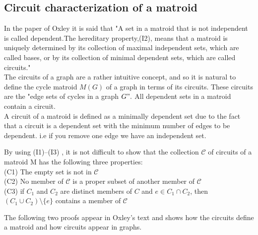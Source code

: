 \documentclass[../main.tex]{subfiles}
\begin{document}
\subsection{Circuit characterization of a matroid}
In the paper of Oxley \cite{ox_paper} it is said that "A set in a matroid that is not independent is called dependent.The hereditary property,(I2), means that a matroid is uniquely determined by its collection of maximal independent sets, which are called bases, or by its collection of minimal dependent sets, which are called circuits." \\
\indent The circuits of a graph are a rather intuitive concept, and so it is natural to define the cycle matroid $M(G)$ of a graph in terms of its circuits. These circuits are the "edge sets of cycles in a graph $G".$ All dependent sets in a matroid contain a circuit.\\
\indent A circuit of a matroid is defined as a minimally dependent set due to the fact that a circuit is a dependent set with the minimum number of edges to be dependent. i.e if you remove one edge we have an independent set.

\begin{defn} By using (I1)–(I3) , it is not difficult to show that the collection $\mathcal{C}$ of circuits of a matroid M has the following three properties:\\
(C1) The empty set is not in $\mathcal{C}$\\
(C2) No member of $\mathcal{C}$ is a proper subset of another member of $\mathcal{C}$\\
(C3) if $ C_1 $ and $ C_2 $ are distinct members of $ C $ and 
$ e \in C_1 \cap C_2 $, then $ (C_1 \cup C_2 ) \setminus \{e\} $ contains a member of $\mathcal{C}$ 
 \end{defn}
 
\noindent The following two proofs appear in Oxley's text and shows how the circuits define a matroid and how circuits appear in graphs.\cite{ox_book}
\end{document}
